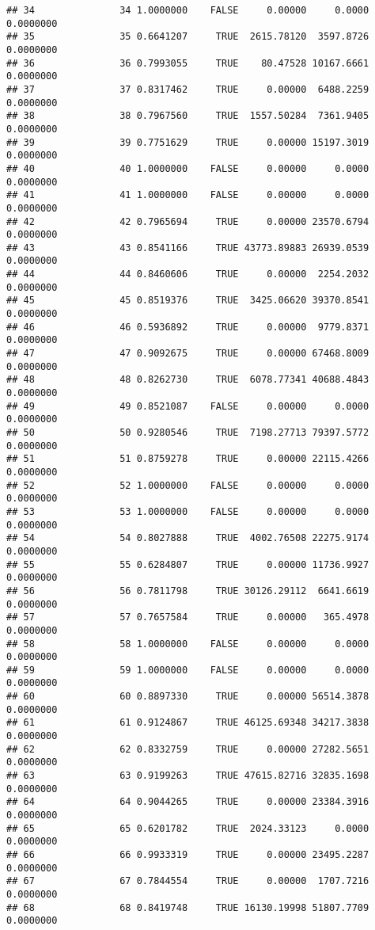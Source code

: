 \documentclass[
]{article}
\begin{document}
\begin{verbatim}
## 34               34 1.0000000    FALSE     0.00000     0.0000  0.0000000
## 35               35 0.6641207     TRUE  2615.78120  3597.8726  0.0000000
## 36               36 0.7993055     TRUE    80.47528 10167.6661  0.0000000
## 37               37 0.8317462     TRUE     0.00000  6488.2259  0.0000000
## 38               38 0.7967560     TRUE  1557.50284  7361.9405  0.0000000
## 39               39 0.7751629     TRUE     0.00000 15197.3019  0.0000000
## 40               40 1.0000000    FALSE     0.00000     0.0000  0.0000000
## 41               41 1.0000000    FALSE     0.00000     0.0000  0.0000000
## 42               42 0.7965694     TRUE     0.00000 23570.6794  0.0000000
## 43               43 0.8541166     TRUE 43773.89883 26939.0539  0.0000000
## 44               44 0.8460606     TRUE     0.00000  2254.2032  0.0000000
## 45               45 0.8519376     TRUE  3425.06620 39370.8541  0.0000000
## 46               46 0.5936892     TRUE     0.00000  9779.8371  0.0000000
## 47               47 0.9092675     TRUE     0.00000 67468.8009  0.0000000
## 48               48 0.8262730     TRUE  6078.77341 40688.4843  0.0000000
## 49               49 0.8521087    FALSE     0.00000     0.0000  0.0000000
## 50               50 0.9280546     TRUE  7198.27713 79397.5772  0.0000000
## 51               51 0.8759278     TRUE     0.00000 22115.4266  0.0000000
## 52               52 1.0000000    FALSE     0.00000     0.0000  0.0000000
## 53               53 1.0000000    FALSE     0.00000     0.0000  0.0000000
## 54               54 0.8027888     TRUE  4002.76508 22275.9174  0.0000000
## 55               55 0.6284807     TRUE     0.00000 11736.9927  0.0000000
## 56               56 0.7811798     TRUE 30126.29112  6641.6619  0.0000000
## 57               57 0.7657584     TRUE     0.00000   365.4978  0.0000000
## 58               58 1.0000000    FALSE     0.00000     0.0000  0.0000000
## 59               59 1.0000000    FALSE     0.00000     0.0000  0.0000000
## 60               60 0.8897330     TRUE     0.00000 56514.3878  0.0000000
## 61               61 0.9124867     TRUE 46125.69348 34217.3838  0.0000000
## 62               62 0.8332759     TRUE     0.00000 27282.5651  0.0000000
## 63               63 0.9199263     TRUE 47615.82716 32835.1698  0.0000000
## 64               64 0.9044265     TRUE     0.00000 23384.3916  0.0000000
## 65               65 0.6201782     TRUE  2024.33123     0.0000  0.0000000
## 66               66 0.9933319     TRUE     0.00000 23495.2287  0.0000000
## 67               67 0.7844554     TRUE     0.00000  1707.7216  0.0000000
## 68               68 0.8419748     TRUE 16130.19998 51807.7709  0.0000000

\end{verbatim}
\end{document}
